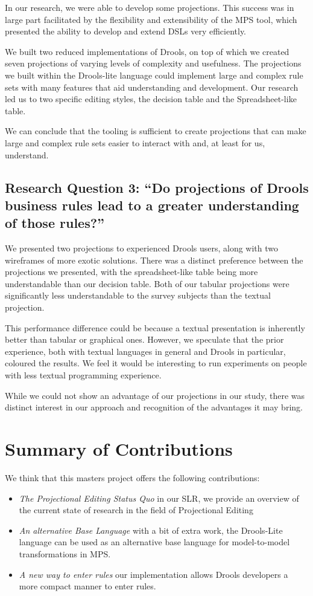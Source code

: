 In our research, we were able to develop some projections.  
This success was in large part facilitated by the flexibility and extensibility of the MPS tool, which presented the ability to develop and extend DSLs very efficiently.

We built two reduced implementations of Drools, on top of which we created seven projections of varying levels of complexity and usefulness.
The projections we built within the Drools-lite language could implement large and complex rule sets with many features that aid understanding and development.
Our research led us to two specific editing styles, the decision table and the Spreadsheet-like table.

We can conclude that the tooling is sufficient to create projections that can make large and complex rule sets easier to interact with and, at least for us, understand.

\subsection{Research Question 3: ``Do projections of Drools business rules lead to a greater understanding of those rules?''}

We presented two projections to experienced Drools users, along with two wireframes of more exotic solutions.
There was a distinct preference between the projections we presented, with the spreadsheet-like table being more understandable than our decision table.
Both of our tabular projections were significantly less understandable to the survey subjects than the textual projection.

This performance difference could be because a textual presentation is inherently better than tabular or graphical ones.
However, we speculate that the prior experience, both with textual languages in general and Drools in particular, coloured the results.
We feel it would be interesting to run experiments on people with less textual programming experience.

While we could not show an advantage of our projections in our study, there was distinct interest in our approach and recognition of the advantages it may bring.

\section{Summary of Contributions}

We think that this masters project offers the following contributions:
\begin{itemize}
    \item \emph{The Projectional Editing Status Quo} in our SLR, we provide an overview of the current state of research in the field of Projectional Editing
    \item \emph{An alternative Base Language} with a bit of extra work, the Drools-Lite language can be used as an alternative base language for model-to-model transformations in MPS.
    \item \emph{A new way to enter rules} our implementation allows Drools developers a more compact manner to enter rules.
\end{itemize}

